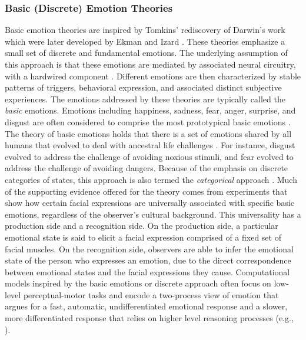 \documentclass[12pt]{report}
\begin{document}
\subsubsection{Basic (Discrete) Emotion Theories}
\label{sec:discrete-emotions}

Basic emotion theories are inspired by Tomkins' \cite{tomkins:affect}
rediscovery of Darwin's work
\cite{darwin:emotion-expression,hess:darwin-emotion} which were later developed
by Ekman \cite{ekman:argument-emotions} and Izard \cite{izard:human-emotions}.
These theories emphasize a small set of discrete and fundamental emotions.
The underlying assumption of this approach is that these emotions are mediated
by associated neural circuitry, with a hardwired component
\cite{ekman:argument-emotions}. Different emotions are then characterized by
stable patterns of triggers, behavioral expression, and associated distinct
subjective experiences. The emotions addressed by these theories are typically
called the \textit{basic} emotions. Emotions including happiness, sadness, fear,
anger, surprise, and disgust are often considered to comprise the most
prototypical basic emotions \cite{ekman:argument-emotions}. The theory of basic
emotions holds that there is a set of emotions shared by all humans that evolved
to deal with ancestral life challenges \cite{ekman:argument-emotions}. For
instance, disgust evolved to address the challenge of avoiding noxious stimuli,
and fear evolved to address the challenge of avoiding dangers. Because of the
emphasis on discrete categories of states, this approach is also termed the
\textit{categorical} approach \cite{panskepp:affective-neuroscience}. Much of
the supporting evidence offered for the theory comes from experiments that show
how certain facial expressions are universally associated with specific basic
emotions, regardless of the observer's cultural background. This universality
has a production side and a recognition side. On the production side, a
particular emotional state is said to elicit a facial expression comprised of a
fixed set of facial muscles. On the recognition side, observers are able to
infer the emotional state of the person who expresses an emotion, due to the
direct correspondence between emotional states and the facial expressions they
cause. Computational models inspired by the basic emotions or discrete approach
often focus on low-level perceptual-motor tasks and encode a two-process view of
emotion that argues for a fast, automatic, undifferentiated emotional response
and a slower, more differentiated response that relies on higher level reasoning
processes (e.g., \cite{armony:computational-modeling-emotion}). \\
\end{document}
